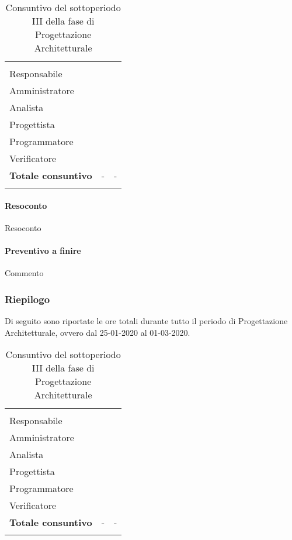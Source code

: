 \begin{longtable}{ C{4cm} C{3cm} C{3.5cm}} 
 	 &
 	 &
 	 \\
 	
 	Responsabile &  & \\
 	Amministratore &  & \\
 	Analista & & \\
 	Progettista & & \\
 	Programmatore & &\\
 	Verificatore & & \\
 	
	\hline 	
 	
 	\textbf{Totale consuntivo} &
	- \color{coloreRosso}{\textbf{(+--)}} &
 	- \\	
 	
 	\caption{Consuntivo del sottoperiodo III della fase di Progettazione Architetturale}
\end{longtable}

\vspace{-1cm}

\paragraph{Resoconto}
Resoconto
\paragraph{Preventivo a finire}
Commento

\subsubsection{Riepilogo}

Di seguito sono riportate le ore totali durante tutto il periodo di Progettazione Architetturale, ovvero dal 25-01-2020 al 01-03-2020.

\begin{longtable}{ C{4cm} C{3cm} C{3.5cm}} 
 	 &
 	 &
 	 \\
 	
 	Responsabile &  & \\
 	Amministratore &  & \\
 	Analista & & \\
 	Progettista & & \\
 	Programmatore & &\\
 	Verificatore & & \\
 	
	\hline 	
 	
 	\textbf{Totale consuntivo} &
	- \color{coloreRosso}{\textbf{(+--)}} &
 	- \\	
 	
 	\caption{Consuntivo del sottoperiodo III della fase di Progettazione Architetturale}
\end{longtable}

